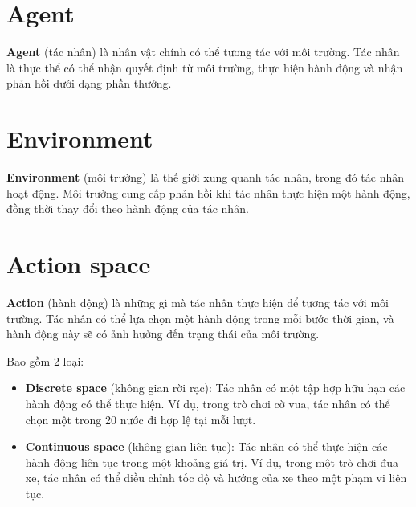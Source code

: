 \documentclass[final,letterpaper,twoside,12pt]{report}
\begin{document}
\begin{center}

		\end{center}

	\newpage

\section{Agent}
\textbf{Agent} (tác nhân) là nhân vật chính có thể tương tác với môi trường. Tác nhân là thực thể có thể nhận quyết định từ môi trường, thực hiện hành động và nhận phản hồi dưới dạng phần thưởng.

\section{Environment}
\textbf{Environment} (môi trường) là thế giới xung quanh tác nhân, trong đó tác nhân hoạt động. Môi trường cung cấp phản hồi khi tác nhân thực hiện một hành động, đồng thời thay đổi theo hành động của tác nhân.

\section{Action space}
\textbf{Action} (hành động) là những gì mà tác nhân thực hiện để tương tác với môi trường. Tác nhân có thể lựa chọn một hành động trong mỗi bước thời gian, và hành động này sẽ có ảnh hưởng đến trạng thái của môi trường.

Bao gồm 2 loại:
\begin{itemize}
	\item \textbf{Discrete space} (không gian rời rạc): Tác nhân có một tập hợp hữu hạn các hành động có thể thực hiện. Ví dụ, trong trò chơi cờ vua, tác nhân có thể chọn một trong 20 nước đi hợp lệ tại mỗi lượt.
	\item \textbf{Continuous space} (không gian liên tục): Tác nhân có thể thực hiện các hành động liên tục trong một khoảng giá trị. Ví dụ, trong một trò chơi đua xe, tác nhân có thể điều chỉnh tốc độ và hướng của xe theo một phạm vi liên tục.
\end{itemize}
\end{document}
